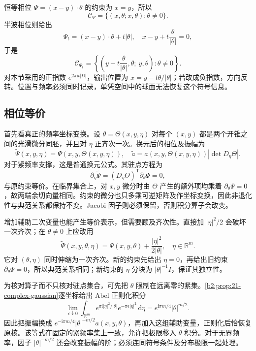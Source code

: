 \ProseParagraphBreak
恒等相位 \(\Psi=(x-y)\cdot\theta\) 的约束为 \(x=y\)，所以
\[
 \mathcal C_\Psi=\{(x,\theta;x,\theta):\theta\ne0\}.
\]
半波相位则给出
\[
 \Psi_t=(x-y)\cdot\theta+t|\theta|,
 \quad x-y+t\frac{\theta}{|\theta|}=0,
\]
于是
\[
 \mathcal C_{\Psi_t}
 =\left\{\left(y-t\frac{\theta}{|\theta|},\theta;\ y,\theta\right):
          \theta\ne0\right\}.
\]
对本节采用的正指数 \(e^{2\pi\mathrm i t|D|}\)，输出位置为
\(x=y-t\theta/|\theta|\)；若改成负指数，方向反转。位置与频率必须同时记录，单凭空间中的球面无法恢复这个符号信息。

\subsection{相位等价}
\label{b2:subsec:210503}

首先看真正的频率坐标变换。设
\(\theta=\Theta(x,y,\eta)\) 对每个 \((x,y)\) 都是两个开锥之间的光滑微分同胚，并且对 \(\eta\) 正齐次一次。换元后的相位及振幅为
\[
 \widetilde\Psi(x,y,\eta)=\Psi(x,y,\Theta(x,y,\eta)),
 \quad
 \widetilde a=a(x,y,\Theta(x,y,\eta))
              |\det D_\eta\Theta|.
\]
对于紧频率支撑，这是普通换元公式。其驻点方程为
\[
 \partial_\eta\widetilde\Psi
 =(D_\eta\Theta)^{\mathsf T}\partial_\theta\Psi=0,
\]
与原约束等价。在临界集合上，对 \(x,y\) 微分时由 \(\Theta\) 产生的额外项均乘着 \(\partial_\theta\Psi=0\)，故两端余切向量相同。约束的微分也只多乘可逆矩阵及作坐标变换，因此非退化性与典范关系都保持不变。Jacobi 因子则必须保留，否则积分算子会改变。

\ProseParagraphBreak
增加辅助二次变量也能产生等价表示，但需要顾及齐次性。直接加 \(|\eta|^2/2\) 会破坏一次齐次；在 \(\theta\ne0\) 上应改用
\[
 \widetilde\Psi(x,y,\theta,\eta)
 =\Psi(x,y,\theta)+\frac{|\eta|^2}{2|\theta|},
 \quad\eta\in\mathbb R^m.
\]
它对 \((\theta,\eta)\) 同时伸缩为一次齐次。新的约束先给出 \(\eta=0\)，再给出旧约束 \(\partial_\theta\Psi=0\)，所以典范关系相同；新约束的 \(\eta\) 分块为 \(|\theta|^{-1}I\)，保证其独立性。

\ProseParagraphBreak
为核对算子而不只核对驻点集合，可先把 \(\theta\) 限制在远离零的紧集。\cref{b2:prop:21-complex-gaussian}逐坐标给出 Abel 正则化积分
\[
 \lim_{\epsilon\downarrow0}\int_{\mathbb R^m}
 e^{\pi\mathrm i|\eta|^2/|\theta|}
 e^{-\pi\epsilon|\eta|^2}\,\mathrm d\eta
 =e^{\mathrm i\pi m/4}|\theta|^{m/2}.
\]
因此把振幅换成
\(e^{-\mathrm i\pi m/4}|\theta|^{-m/2}a(x,y,\theta)\)，再加入这组辅助变量，正则化后恰恢复原核。该等式在固定的紧频率集上一致，允许把极限移入 \(\theta\) 积分。对于无界频率，因子 \(|\theta|^{-m/2}\) 还会改变振幅的阶；必须连同符号条件及分布极限一起处理。

